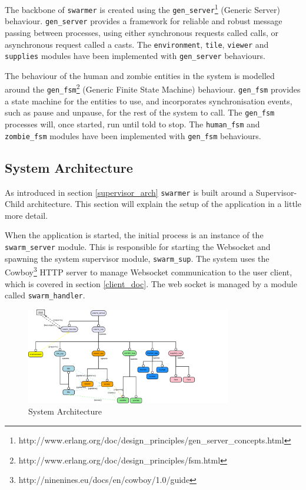 The backbone of \verb+swarmer+ is created using the \verb+gen_server+\footnote{http://www.erlang.org/doc/design\_principles/gen\_server\_concepts.html} (Generic Server) behaviour. \verb+gen_server+ provides a framework for reliable and robust message passing between processes, using either synchronous requests called calls, or asynchronous request called a casts. The \verb+environment+, \verb+tile+, \verb+viewer+ and \verb+supplies+ modules have been implemented with \verb+gen_server+ behaviours.

The behaviour of the human and zombie entities in the system is modelled around the \verb+gen_fsm+\footnote{http://www.erlang.org/doc/design\_principles/fsm.html} (Generic Finite State Machine) behaviour. \verb+gen_fsm+ provides a state machine for the entities to use, and incorporates synchronisation events, such as pause and unpause, for the rest of the system to call. The \verb+gen_fsm+ processes will, once started, run until told to stop. The \verb+human_fsm+ and \verb+zombie_fsm+ modules have been implemented with \verb+gen_fsm+ behaviours.

\subsection{System Architecture}
\label{sys_overview_architecture}
As introduced in section \ref{supervisor_arch} \verb+swarmer+ is built around a Supervisor-Child architecture. This section will explain the setup of the application in a little more detail.

When the application is started, the initial process is an instance of the \verb+swarm_server+ module. This is responsible for starting the Websocket and spawning the system supervisor module, \verb+swarm_sup+. The system uses the Cowboy\footnote{http://ninenines.eu/docs/en/cowboy/1.0/guide} HTTP server to manage Websocket communication to the user client, which is covered in section \ref{client_doc}. The web socket is managed by a module called \verb+swarm_handler+.

\begin{figure}[h]
  \centering
  \includegraphics[width=0.8\textwidth]{img/final_system_ws.png}
\caption{System Architecture}
    \label{fig:system_ws}
\end{figure}


